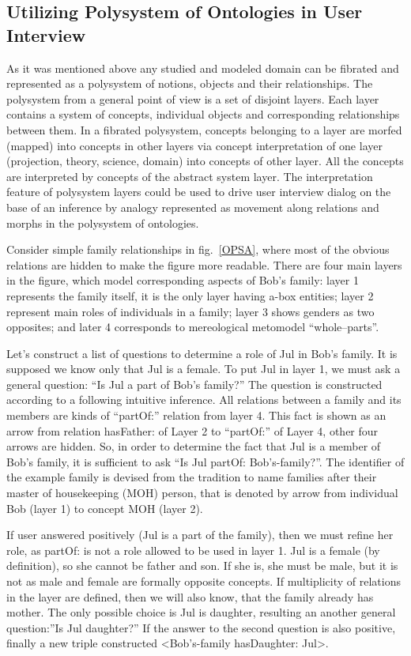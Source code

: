 \documentclass[conference]{IEEEtran}
\begin{document}
\subsection{Utilizing Polysystem of Ontologies in User Interview}
As it was mentioned above any studied and modeled domain can be fibrated and represented as a polysystem of notions, objects and their relationships. The polysystem from a general point of view is a set of disjoint layers. Each layer contains a system of concepts, individual objects and corresponding relationships between them. In a fibrated polysystem, concepts belonging to a layer are morfed (mapped) into concepts in other layers via concept interpretation of one layer (projection, theory, science, domain) into concepts of other layer. All the concepts are interpreted by concepts of the abstract system layer. The interpretation feature of polysystem layers could be used to drive user interview dialog on the base of an inference by analogy represented as movement along relations and morphs in the polysystem of ontologies.

Consider simple family relationships in fig.~\ref{OPSA}, where most of the obvious relations are hidden to make the figure more readable. There are four main layers in the figure, which model corresponding aspects of Bob's family: layer 1 represents the family itself, it is the only layer having a-box entities; layer 2 represent main roles of individuals in a family; layer 3 shows genders as two opposites; and later 4 corresponds to mereological metomodel ``whole--parts''.

Let's construct a list of questions to determine a role of Jul in Bob's family. It is supposed we know only that Jul is a female. To put Jul in layer 1, we must ask a general question: ``Is Jul a part of Bob's family?'' The question is constructed according to a following intuitive inference. All relations between a family and its members are kinds of ``partOf:'' relation from layer 4. This fact is shown as an arrow from relation hasFather: of Layer 2 to ``partOf:'' of Layer 4, other four arrows are hidden. So, in order to determine the fact that Jul is a member of Bob's family, it is sufficient to ask ``Is Jul partOf: Bob's-family?''. The identifier of the example family is devised from the tradition to name families after their master of housekeeping (MOH) person, that is denoted by arrow from individual Bob (layer 1) to concept MOH (layer 2).

If user answered positively (Jul is a part of the family), then we must refine her role, as partOf: is not a role allowed to be used in layer 1. Jul is a female (by definition), so she cannot be father and son. If she is, she must be male, but it is not as male and female are formally opposite concepts. If multiplicity of relations in the layer are defined, then we will also know, that the family already has mother. The only possible choice is Jul is daughter, resulting an another general question:''Is Jul daughter?'' If the answer to the second question is also positive, finally a new triple constructed <Bob's-family hasDaughter: Jul>.
\end{document}
